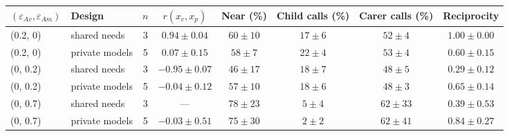 \begin{tabular}{@{}llcccccc@{}}
\toprule
$(\varepsilon_{Av},\varepsilon_{Am})$ & Design & $n$ & $r(x_c,x_p)$ & Near (\%) & Child calls (\%) & Carer calls (\%) & Reciprocity \\
\midrule
(0.2, 0) & shared needs & 3 & $0.94 \pm 0.04$ & $60 \pm 10$ & $17 \pm 6$ & $52 \pm 4$ & $1.00 \pm 0.00$ \\
(0.2, 0) & private models & 5 & $0.07 \pm 0.15$ & $58 \pm 7$ & $22 \pm 4$ & $53 \pm 4$ & $0.60 \pm 0.15$ \\
(0, 0.2) & shared needs & 3 & $-0.95 \pm 0.07$ & $46 \pm 17$ & $18 \pm 7$ & $48 \pm 5$ & $0.29 \pm 0.12$ \\
(0, 0.2) & private models & 5 & $-0.04 \pm 0.12$ & $57 \pm 10$ & $18 \pm 6$ & $48 \pm 3$ & $0.65 \pm 0.14$ \\
(0, 0.7) & shared needs & 3 & --- & $78 \pm 23$ & $5 \pm 4$ & $62 \pm 33$ & $0.39 \pm 0.53$ \\
(0, 0.7) & private models & 5 & $-0.03 \pm 0.51$ & $75 \pm 30$ & $2 \pm 2$ & $62 \pm 41$ & $0.84 \pm 0.27$ \\
\bottomrule
\end{tabular}

